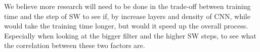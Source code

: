 \documentclass[a4paper,10pt]{article}
\begin{document}
We believe more research will need to be done in the trade-off between training time and the step of SW to see if, by increase layers and density of CNN, while would take the training time longer, but would it speed up the overall process. Especially when looking at the bigger filter and the higher SW steps, to see what the correlation between these two factors are.

%	

	
	
	
	
	
\end{document}

